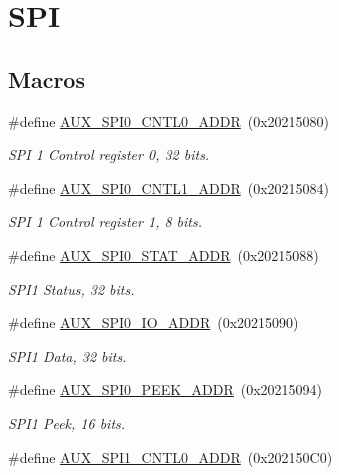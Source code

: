 \hypertarget{group__SPI}{}\section{S\+PI}
\label{group__SPI}
\subsection*{Macros}
\begin{DoxyCompactItemize}
\item 
\#define \hyperlink{group__SPI_gac015fcc23c0188e07727022cb742da3b}{A\+U\+X\+\_\+\+S\+P\+I0\+\_\+\+C\+N\+T\+L0\+\_\+\+A\+D\+DR}~(0x20215080)
\begin{DoxyCompactList}\small\item\em S\+PI 1 Control register 0, 32 bits. \end{DoxyCompactList}\item 
\#define \hyperlink{group__SPI_gaa4cdf59ae699e8e598ac84dc6f98e65e}{A\+U\+X\+\_\+\+S\+P\+I0\+\_\+\+C\+N\+T\+L1\+\_\+\+A\+D\+DR}~(0x20215084)
\begin{DoxyCompactList}\small\item\em S\+PI 1 Control register 1, 8 bits. \end{DoxyCompactList}\item 
\#define \hyperlink{group__SPI_ga7630890159506d96bfeb196837c2efba}{A\+U\+X\+\_\+\+S\+P\+I0\+\_\+\+S\+T\+A\+T\+\_\+\+A\+D\+DR}~(0x20215088)
\begin{DoxyCompactList}\small\item\em S\+P\+I1 Status, 32 bits. \end{DoxyCompactList}\item 
\#define \hyperlink{group__SPI_ga9ffd1ea2cfa82c89ef664ce216453987}{A\+U\+X\+\_\+\+S\+P\+I0\+\_\+\+I\+O\+\_\+\+A\+D\+DR}~(0x20215090)
\begin{DoxyCompactList}\small\item\em S\+P\+I1 Data, 32 bits. \end{DoxyCompactList}\item 
\#define \hyperlink{group__SPI_gaaee919a849467dd94432c2852c391374}{A\+U\+X\+\_\+\+S\+P\+I0\+\_\+\+P\+E\+E\+K\+\_\+\+A\+D\+DR}~(0x20215094)
\begin{DoxyCompactList}\small\item\em S\+P\+I1 Peek, 16 bits. \end{DoxyCompactList}\item 
\#define \hyperlink{group__SPI_ga653371033335ebe3d90109699e4e1c82}{A\+U\+X\+\_\+\+S\+P\+I1\+\_\+\+C\+N\+T\+L0\+\_\+\+A\+D\+DR}~(0x202150\+C0)

\end{DoxyCompactItemize}
